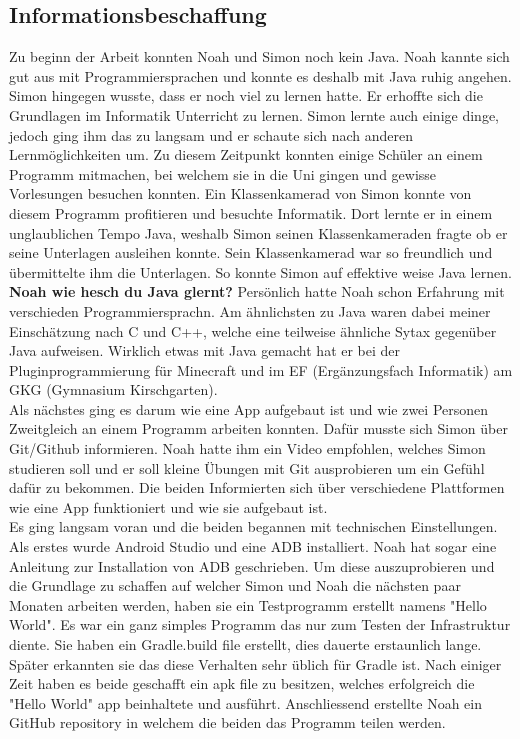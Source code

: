 \documentclass[a4paper,11pt]{article}
\begin{document}
\subsection{Informationsbeschaffung}

Zu beginn der Arbeit konnten Noah und Simon noch kein Java. Noah kannte sich gut aus mit Programmiersprachen und konnte es deshalb mit Java ruhig angehen.
Simon hingegen wusste, dass er noch viel zu lernen hatte. Er erhoffte sich die Grundlagen im Informatik Unterricht zu lernen. 
Simon lernte auch einige dinge, jedoch ging ihm das zu langsam und er schaute sich nach anderen Lernmöglichkeiten um. 
Zu diesem Zeitpunkt konnten einige Schüler an einem Programm mitmachen, bei welchem sie in die Uni gingen und gewisse 
Vorlesungen besuchen konnten. Ein Klassenkamerad von Simon konnte von diesem Programm profitieren und besuchte Informatik. 
Dort lernte er in einem unglaublichen Tempo Java, weshalb Simon seinen Klassenkameraden fragte ob er seine Unterlagen ausleihen konnte. 
Sein Klassenkamerad war so freundlich und übermittelte ihm die Unterlagen. So konnte Simon auf effektive weise Java lernen. \\

\textbf{ Noah wie hesch du Java glernt?}
Persönlich hatte Noah schon Erfahrung mit verschieden Programmiersprachn. Am ähnlichsten zu Java waren dabei meiner Einschätzung nach C und C++, welche eine teilweise ähnliche Sytax gegenüber Java aufweisen. Wirklich etwas mit Java gemacht hat er bei der Pluginprogrammierung für Minecraft und im EF (Ergänzungsfach Informatik) am GKG (Gymnasium Kirschgarten).\\

Als nächstes ging es darum wie eine App aufgebaut ist und wie zwei Personen Zweitgleich an einem 
Programm arbeiten konnten. Dafür musste sich Simon über Git/Github informieren. Noah hatte ihm ein Video empfohlen, welches 
Simon studieren soll und er soll kleine Übungen mit Git ausprobieren um ein Gefühl dafür zu bekommen. Die beiden Informierten 
sich über verschiedene Plattformen wie eine App funktioniert und wie sie aufgebaut ist. \\ 

Es ging langsam voran und die beiden begannen mit technischen Einstellungen. Als erstes 
wurde Android Studio  und eine ADB installiert. Noah hat sogar eine Anleitung zur Installation von ADB geschrieben. 
Um diese auszuprobieren und die Grundlage zu schaffen auf welcher Simon und Noah die nächsten paar Monaten arbeiten werden, haben sie ein
Testprogramm erstellt namens "Hello World". Es war ein ganz simples Programm das nur zum Testen der Infrastruktur diente. 
Sie haben ein Gradle.build file erstellt, dies dauerte erstaunlich lange. Später erkannten sie das diese Verhalten sehr üblich für 
Gradle ist. Nach einiger Zeit haben es beide geschafft ein apk file zu besitzen, welches erfolgreich die "Hello World" app beinhaltete und ausführt. 
Anschliessend erstellte Noah ein GitHub repository in welchem die beiden das Programm teilen werden. \\
\end{document}
